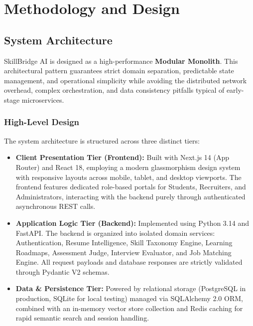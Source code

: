 \documentclass[12pt,a4paper,oneside]{report}
\begin{document}
\setcounter{page}{7}
\chapter{Methodology and Design}

\section{System Architecture}
SkillBridge AI is designed as a high-performance \textbf{Modular Monolith}. This architectural pattern guarantees strict domain separation, predictable state management, and operational simplicity while avoiding the distributed network overhead, complex orchestration, and data consistency pitfalls typical of early-stage microservices.

\subsection{High-Level Design}
The system architecture is structured across three distinct tiers:
\begin{itemize}[leftmargin=0.8cm]
    \item \textbf{Client Presentation Tier (Frontend):} Built with Next.js 14 (App Router) and React 18, employing a modern glassmorphism design system with responsive layouts across mobile, tablet, and desktop viewports. The frontend features dedicated role-based portals for Students, Recruiters, and Administrators, interacting with the backend purely through authenticated asynchronous REST calls.
    \item \textbf{Application Logic Tier (Backend):} Implemented using Python 3.14 and FastAPI. The backend is organized into isolated domain services: Authentication, Resume Intelligence, Skill Taxonomy Engine, Learning Roadmaps, Assessment Judge, Interview Evaluator, and Job Matching Engine. All request payloads and database responses are strictly validated through Pydantic V2 schemas.
    \item \textbf{Data \& Persistence Tier:} Powered by relational storage (PostgreSQL in production, SQLite for local testing) managed via SQLAlchemy 2.0 ORM, combined with an in-memory vector store collection and Redis caching for rapid semantic search and session handling.
\end{itemize}
\end{document}
